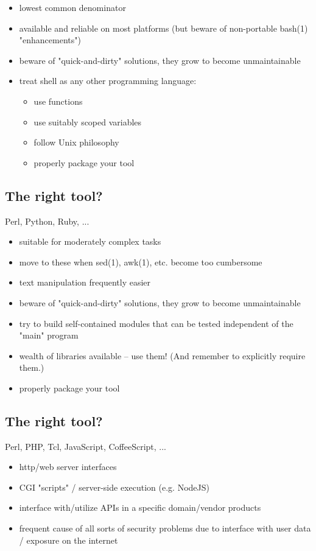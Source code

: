 \documentclass[xga]{xdvislides}
\begin{document}
\begin{itemize}
	\item lowest common denominator
	\item available and reliable on most platforms (but beware of non-portable
		bash(1) "enhancements")
	\item beware of "quick-and-dirty" solutions, they grow to become
		unmaintainable
	\item treat shell as any other programming language:
		\begin{itemize}
			\item use functions
			\item use suitably scoped variables
			\item follow Unix philosophy
			\item properly package your tool
		\end{itemize}
\end{itemize}


\subsection{The right tool?}
Perl, Python, Ruby, ... \\

\begin{itemize}
	\item suitable for moderately complex tasks
	\item move to these when sed(1), awk(1), etc. become too cumbersome
	\item text manipulation frequently easier
	\item beware of "quick-and-dirty" solutions, they grow to become
		unmaintainable
	\item try to build self-contained modules that can be tested independent of
		the "main" program
	\item wealth of libraries available -- use them! (And remember to explicitly
		require them.)
	\item properly package your tool
\end{itemize}

\subsection{The right tool?}
Perl, PHP, Tcl, JavaScript, CoffeeScript, ... \\

\begin{itemize}
	\item http/web server interfaces
	\item CGI "scripts" / server-side execution (e.g. NodeJS)
	\item interface with/utilize APIs in a specific domain/vendor products
	\item frequent cause of all sorts of security problems due to interface with
		user data / exposure on the internet
\end{itemize}
\end{document}
